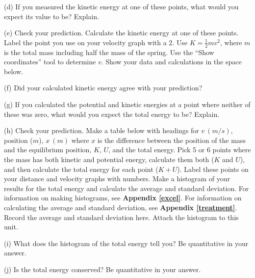 (d) If you measured the kinetic energy at one of these points, what would you
expect its value to be? Explain.
\vspace{20mm}

\newpage
(e) Check your prediction. Calculate the kinetic energy at one of these points.
Label the point you use on your velocity graph with a 2. Use 
$K = \frac{1}{2} mv^{2}$, where $m$ is the total mass including half the mass of 
the spring. Use the ``Show coordinates'' tool to determine $v$. Show your data and 
calculations in the space below.
\vspace{20mm}

(f) Did your calculated kinetic energy agree with your prediction?
\vspace{15mm}

(g) If you calculated the potential and kinetic energies at a point where 
neither of these was zero, what would you expect the total energy to be? 
Explain.
\vspace{20mm}

(h) Check your prediction. Make a table below with headings for $v~(m/s)$, 
position ($m$), $x~(m)$ where $x$ is the difference between the position
of the mass and the equilibrium position, $K$, $U$, and the total energy.
Pick 5 or 6 points where the mass has both kinetic and
potential energy, calculate them both ($K$ and $U$), and then calculate the 
total energy for each point ($K+U$). Label these points on your distance
and velocity graphs with numbers. 
Make a histogram of your results for the total energy and calculate the 
average and standard deviation.
For information on making histograms, see \textbf{Appendix \ref{excel}}. For information 
on calculating the average and standard deviation, see \textbf{Appendix \ref{treatment}}. 
Record the average and standard deviation here.
Attach the histogram to this unit.
\vspace{60mm}

(i) What does the histogram of the total energy tell you? Be quantitative in 
your answer.
\vspace{20mm}

(j) Is the total energy conserved?  Be quantitative in your answer.

